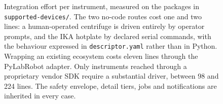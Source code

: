 \begin{figure}[t]
\centering
{}\efftable
{}
\caption{Integration effort per instrument, measured on the packages in
\texttt{supported-devices/}. The two no-code routes cost one and two lines: a
human-operated centrifuge is driven entirely by operator prompts, and the IKA hotplate by
declared serial commands, with the behaviour expressed in \texttt{descriptor.yaml} rather
than in Python. Wrapping an existing ecosystem costs eleven lines through the PyLabRobot
adapter. Only instruments reached through a proprietary vendor SDK require a substantial
driver, between 98 and 224 lines. The safety envelope, detail tiers, jobs and
notifications are inherited in every case.}
\label{fig:effort}
\end{figure}
